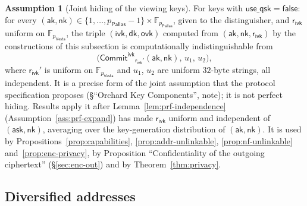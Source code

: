 \documentclass[11pt,a4paper]{article}
\theoremstyle{definition}
\newtheorem{assumption}[theorem]{Assumption}
\newcommand{\F}{\mathbb{F}}
\newcommand{\Pallas}{\ensuremath{\mathsf{Pallas}}}
\newcommand{\Vesta}{\ensuremath{\mathsf{Vesta}}}
\newcommand{\CommitIvk}{\ensuremath{\mathsf{Commit}^{\mathsf{ivk}}}}
\newcommand{\ask}{\ensuremath{\mathsf{ask}}}
\newcommand{\aksym}{\ensuremath{\mathsf{ak}}}
\newcommand{\nksym}{\ensuremath{\mathsf{nk}}}
\newcommand{\ivk}{\ensuremath{\mathsf{ivk}}}
\newcommand{\ovk}{\ensuremath{\mathsf{ovk}}}
\newcommand{\dk}{\ensuremath{\mathsf{dk}}}
\newcommand{\rivk}{\ensuremath{\mathsf{r_{ivk}}}}
\begin{document}
\begin{assumption}[Joint hiding of the viewing keys]\label{ass:vk-hiding}
For keys with $\mathsf{use\_qsk} = \mathsf{false}$: for every
$(\aksym, \nksym) \in \{1, \dots, p_{\Pallas} - 1\} \times \F_{p_{\Pallas}}$,
given to the distinguisher, and $\rivk$ uniform on $\F_{p_{\Vesta}}$, the
triple $(\ivk, \dk, \ovk)$ computed from $(\aksym, \nksym, \rivk)$ by the
constructions of this subsection is computationally indistinguishable from
\[
  \bigl(\CommitIvk_{\rivk'}(\aksym, \nksym),\, u_1,\, u_2\bigr),
\]
where $\rivk'$ is uniform on $\F_{p_{\Vesta}}$ and $u_1$, $u_2$ are uniform
$32$-byte strings, all independent. It is a precise form of the joint
assumption that the protocol specification proposes (\S``Orchard Key
Components'', note); it is not perfect hiding. Results apply it after
Lemma~\ref{lem:prf-independence} (Assumption~\ref{ass:prf-expand}) has made
$\rivk$ uniform and independent of $(\ask, \nksym)$, averaging over the
key-generation distribution of $(\aksym, \nksym)$. It is used by
Propositions~\ref{prop:capabilities}, \ref{prop:addr-unlinkable},
\ref{prop:nf-unlinkable} and~\ref{prop:enc-privacy}, by Proposition
``Confidentiality of the outgoing ciphertext'' (\S\ref{sec:enc-out}) and by
Theorem~\ref{thm:privacy}.
\end{assumption}

\FloatBarrier
\subsection{Diversified addresses}\label{sec:keys-addr}
\end{document}
